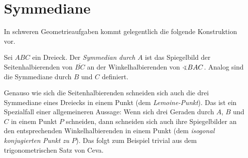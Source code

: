 \section{Symmediane}\label{kapitel:Symmediane}

In schweren Geometrieaufgaben kommt gelegentlich die folgende Konstruktion vor.	

\begin{definition}
	Sei $ABC$ ein Dreieck. Der \emph{Symmedian durch $A$} ist das Spiegelbild der Seitenhalbierenden von $\overline{BC}$ an der Winkelhalbierenden von $\winkel BAC$. Analog sind die Symmediane durch $B$ und $C$ definiert.
\end{definition}
Genauso wie sich die Seitenhalbierenden schneiden sich auch die drei Symmediane eines Dreiecks in einem Punkt (dem \emph{Lemoine-Punkt}). Das ist ein Spezialfall einer allgemeineren Aussage: Wenn sich drei Geraden durch $A$, $B$ und $C$ in einem Punkt $P$ schneiden, dann schneiden sich auch ihre Spiegelbilder an den entsprechenden Winkelhalbierenden in einem Punkt (dem \emph{isogonal konjugierten Punkt zu $P$}). Das folgt zum Beispiel trivial aus dem trigonometrischen Satz von Ceva.

